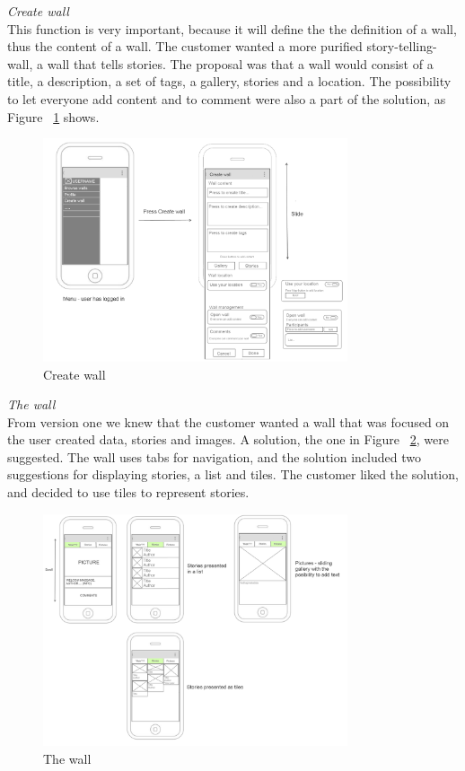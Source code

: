 \documentclass[11pt]{book}
\begin{document}
\textit{Create wall}\\
This function is very important, because it will define the the definition of a wall, thus the content of a wall. The customer wanted a more purified story-telling-wall, a wall that tells stories. The proposal was that a wall would consist of a title, a description, a set of tags, a gallery, stories and a location. The possibility to let everyone add content and to comment were also a part of the solution, as Figure ~\ref{fig:phases_sprint1_uiVersionTwoCreateWallDocument} shows.

\begin{figure}[H]
    \centering
    \includegraphics[width=0.8\textwidth]{Figures/Phases/Sprint1/createWallDocument.png}
    \caption{Create wall}
    \label{fig:phases_sprint1_uiVersionTwoCreateWallDocument}
\end{figure}

\textit{The wall}\\
From version one we knew that the customer wanted a wall that was focused on the user created data, stories and images. A solution, the one in Figure ~\ref{fig:phases_sprint1_uiVersionTwoWallFunctions}, were suggested. The wall uses tabs for navigation, and the solution included two suggestions for displaying stories, a list and tiles. The customer liked the solution, and decided to use tiles to represent stories.

\begin{figure}[H]
    \centering
    \includegraphics[width=0.8\textwidth]{Figures/Phases/Sprint1/wallFunctions.png}
    \caption{The wall}
    \label{fig:phases_sprint1_uiVersionTwoWallFunctions}
\end{figure}
\end{document}
